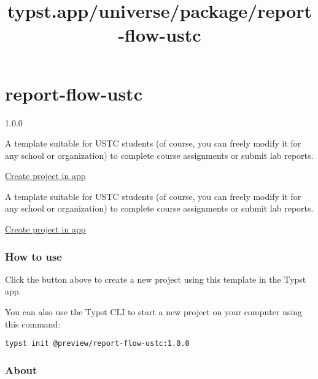 \title{typst.app/universe/package/report-flow-ustc}

\label{banner}
\label{template-thumbnail}

\section{report-flow-ustc}\label{report-flow-ustc}

{ 1.0.0 }

A template suitable for USTC students (of course, you can freely modify
it for any school or organization) to complete course assignments or
submit lab reports.

\href{/app?template=report-flow-ustc&version=1.0.0}{Create project in
app}

\label{readme}
A template suitable for USTC students (of course, you can freely modify
it for any school or organization) to complete course assignments or
submit lab reports.

\href{/app?template=report-flow-ustc&version=1.0.0}{Create project in
app}

\subsubsection{How to use}\label{how-to-use}

Click the button above to create a new project using this template in
the Typst app.

You can also use the Typst CLI to start a new project on your computer
using this command:

\begin{verbatim}
typst init @preview/report-flow-ustc:1.0.0
\end{verbatim}



\subsubsection{About}\label{about}

